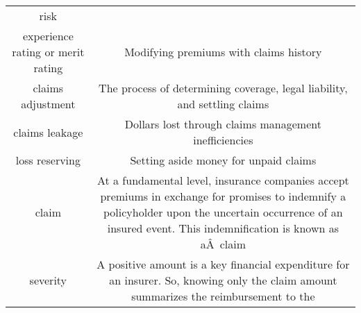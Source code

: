 \documentclass[]{book}
\begin{document}
\begin{longtable}[]{@{}cc@{}}
\begin{minipage}[t]{0.42\columnwidth}
risk\strut
\end{minipage}\tabularnewline
\begin{minipage}[t]{0.41\columnwidth}\centering\strut
experience rating or merit rating\strut
\end{minipage} & \begin{minipage}[t]{0.42\columnwidth}\centering\strut
Modifying premiums with claims history\strut
\end{minipage}\tabularnewline
\begin{minipage}[t]{0.41\columnwidth}\centering\strut
claims adjustment\strut
\end{minipage} & \begin{minipage}[t]{0.42\columnwidth}\centering\strut
The process of determining coverage, legal liability, and settling
claims\strut
\end{minipage}\tabularnewline
\begin{minipage}[t]{0.41\columnwidth}\centering\strut
claims leakage\strut
\end{minipage} & \begin{minipage}[t]{0.42\columnwidth}\centering\strut
Dollars lost through claims management inefficiencies\strut
\end{minipage}\tabularnewline
\begin{minipage}[t]{0.41\columnwidth}\centering\strut
loss reserving\strut
\end{minipage} & \begin{minipage}[t]{0.42\columnwidth}\centering\strut
Setting aside money for unpaid claims\strut
\end{minipage}\tabularnewline
\begin{minipage}[t]{0.41\columnwidth}\centering\strut
claim\strut
\end{minipage} & \begin{minipage}[t]{0.42\columnwidth}\centering\strut
At a fundamental level, insurance companies accept premiums in exchange
for promises to indemnify a policyholder upon the uncertain occurrence
of an insured event. This indemnification is known as aÂ~claim\strut
\end{minipage}\tabularnewline
\begin{minipage}[t]{0.41\columnwidth}\centering\strut
severity\strut
\end{minipage} & \begin{minipage}[t]{0.42\columnwidth}\centering\strut
A positive amount is a key financial expenditure for an insurer. So,
knowing only the claim amount summarizes the reimbursement to the

\end{minipage}
\end{longtable}
\end{document}
